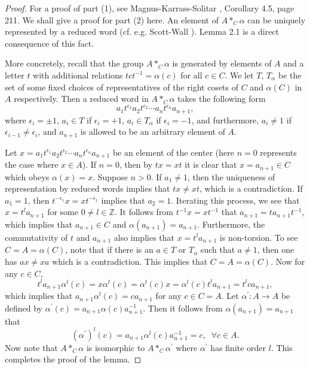 \documentclass[11pt]{amsart}
\theoremstyle{plain}
\numberwithin{theorem}{section}
\theoremstyle{definition}
\begin{document}
\begin{proof}
For a proof of part (1), see Magnus-Karrass-Solitar \cite{MKS}, Corollary 4.5, page 211. We shall give
a proof for part (2) here. An element of $A\ast_C\alpha$ can be uniquely represented by a reduced 
word (cf. e.g. Scott-Wall \cite{SW}). Lemma 2.1 is a direct consequence of this fact. 

More concretely, recall that the group $A\ast_C\alpha$ is generated by elements of $A$ and a letter 
$t$ with additional relations $tct^{-1}=\alpha(c)$ for all $c\in C$. We let $T$, $T_\alpha$ be the set 
of some fixed choices of representatives of the right cosets of $C$ and $\alpha(C)$ in $A$ respectively. 
Then a reduced word in $A\ast_C\alpha$ takes the following form
$$
a_1t^{\epsilon_1}a_2t^{\epsilon_2}\cdots a_nt^{\epsilon_n}a_{n+1},
$$
where $\epsilon_i=\pm 1$, $a_i\in T$ if $\epsilon_i=+1$, $a_i\in T_\alpha$ if $\epsilon_i=-1$, and 
furthermore, $a_i\neq 1$ if $\epsilon_{i-1}\neq \epsilon_i$, and $a_{n+1}$ is allowed to be an arbitrary element of $A$.

Let $x=a_1t^{\epsilon_1}a_2t^{\epsilon_2}\cdots a_nt^{\epsilon_n}a_{n+1}$
be an element of the center (here $n=0$ represents the case where $x\in A$). If $n=0$, then by $tx=xt$
it is clear that $x=a_{n+1}\in C$ which obeys $\alpha(x)=x$. Suppose $n>0$. If $a_1\neq 1$, then the
uniqueness of representation by reduced words implies that $tx\neq xt$, which is a contradiction. 
If $a_1=1$, then $t^{-\epsilon_1}x=xt^{-\epsilon_1}$ implies that $a_2=1$. Iterating this process,
we see that $x=t^l a_{n+1}$ for some $0\neq l\in{{\mathbb Z}}$. It follows from $t^{-1}x=xt^{-1}$ that 
$a_{n+1}=ta_{n+1}t^{-1}$, which implies that $a_{n+1}\in C$ and $\alpha(a_{n+1})=a_{n+1}$.
Furthermore, the commutativity of $t$ and $a_{n+1}$ also implies that $x=t^l a_{n+1}$ is non-torsion. 
To see $C=A=\alpha(C)$, note that if there is an $a\in T$ or $T_\alpha$ such that 
$a\neq 1$, then one has $ax\neq xa$ which is a contradiction. This implies that $C=A=\alpha(C)$.  
Now for any $c\in C$,
$$
t^l a_{n+1} \alpha^l(c)=x\alpha^l(c)=\alpha^l(c)x=\alpha^l(c)t^la_{n+1}=t^l ca_{n+1},
$$
which implies that $a_{n+1} \alpha^l(c)=ca_{n+1}$ for any $c\in C=A$. Let $\alpha^\prime:
A\rightarrow A$ be defined by $\alpha^\prime(c)=a_{n+1}\alpha(c)a_{n+1}^{-1}$. Then it follows from
$\alpha(a_{n+1})=a_{n+1}$ that 
$$
(\alpha^\prime)^l(c)=a_{n+1}\alpha^l(c)a_{n+1}^{-1}=c, \;\;\forall c\in A.
$$
Now note that $A\ast_C\alpha$ is isomorphic to $A\ast_C\alpha^\prime$ where $\alpha^\prime$
has finite order $l$. This completes the proof of the lemma.

\end{proof}
\end{document}
